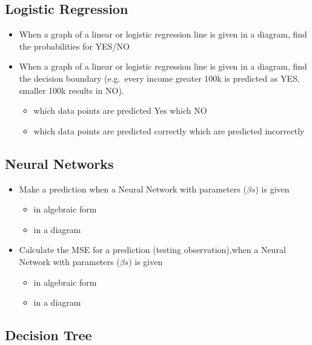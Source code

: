 \documentclass[
  letterpaper,
  DIV=11,
  numbers=noendperiod]{scrartcl}
\providecommand{\tightlist}{%
  \setlength{\itemsep}{0pt}\setlength{\parskip}{0pt}}\usepackage{longtable,booktabs,array}
\begin{document}
\hypertarget{logistic-regression}{%
\subsection{Logistic Regression}\label{logistic-regression}}

\begin{itemize}
\item
  When a graph of a linear or logistic regression line is given in a
  diagram, find the probabilities for YES/NO
\item
  When a graph of a linear or logistic regression line is given in a
  diagram, find the decision boundary (e.g.~every income greater 100k is
  predicted as YES, smaller 100k results in NO).

  \begin{itemize}
  \tightlist
  \item
    which data points are predicted Yes which NO
  \item
    which data points are predicted correctly which are predicted
    incorrectly
  \end{itemize}
\end{itemize}

\hypertarget{neural-networks}{%
\subsection{Neural Networks}\label{neural-networks}}

\begin{itemize}
\tightlist
\item
  Make a prediction when a Neural Network with parameters (\(\beta s\))
  is given

  \begin{itemize}
  \tightlist
  \item
    in algebraic form
  \item
    in a diagram
  \end{itemize}
\item
  Calculate the MSE for a prediction (testing observation),when a Neural
  Network with parameters (\(\beta s\)) is given

  \begin{itemize}
  \tightlist
  \item
    in algebraic form
  \item
    in a diagram
  \end{itemize}
\end{itemize}

\hypertarget{decision-tree}{%
\subsection{Decision Tree}\label{decision-tree}}
\end{document}

